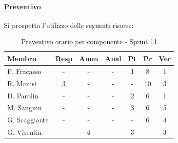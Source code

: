 \documentclass[a4paper,12pt]{article}
\begin{document}
\paragraph{Preventivo}
Si prospetta l'utilizzo delle seguenti risorse:
\begin{table}[H]
    \centering
    \renewcommand{\arraystretch}{1.3}
    \small 
    \begin{tabularx}{\textwidth}{|l|C|C|C|C|C|C|}
        \hline
        \textbf{Membro} & \textbf{Resp} & \textbf{Amm} & \textbf{Anal} & \textbf{Pt} & \textbf{Pr} & \textbf{Ver} \\
        \hline
        F. Fracasso & - & - & - & 1 & 8 & 1 \\
        \hline
        R. Manisi & 3 & - & - & - & 10 & 3 \\
        \hline
        D. Parolin & - & - & - & 2 & 6 & 1 \\
        \hline
        M. Sanguin & - & - & - & 3 & 6 & 5 \\
        \hline
        G. Scaggiante & - & - & - & - & 6 & 4 \\
        \hline
        G. Visentin & - & 4 & - & 3 & - & 3 \\
        \hline
    \end{tabularx}
    \caption{Preventivo orario per componente - Sprint 11}
    \label{tab:preventivo_sprint11}
\end{table}
\end{document}
